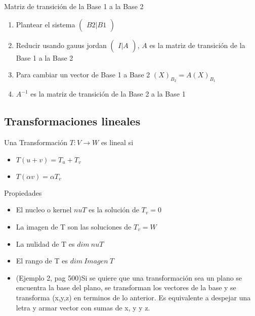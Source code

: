 Matriz de transición de la Base 1 a la Base 2
\begin{enumerate}
	\item Plantear el sistema 
	$\begin{pmatrix}
	B2 | B1
	\end{pmatrix}$
	\item Reducir usando gauus jordan
	$\begin{pmatrix}
	I | A
	\end{pmatrix}$, $A$ es la matriz de transición de la Base 1 a la Base 2
	\item Para cambiar un vector de Base 1 a Base 2 $(X)_{B_2}=A(X)_{B_1}$
	\item $A^{-1}$ es la matriz de transición de la Base 2 a la Base 1
\end{enumerate}

\subsection{Transformaciones lineales}
Una Transformación $T:V\rightarrow W$ es lineal si
\begin{itemize}
	\item $T(u+v)=T_u+T_v$
	\item $T(\alpha v)=\alpha T_v$
\end{itemize}

Propiedades

\begin{itemize}
	\item El nucleo o kernel $nuT$ es la solución de $T_v=0$
	\item La imagen de T son las soluciones de $T_v=W$
	\item La nulidad de T es $dim\  nuT$
	\item El rango de T es $dim\ Imagen\ T$
	\item (Ejemplo 2, pag 500)Si se quiere que una transformación sea un plano se encuentra la base del plano, se transforman los vectores de la base y se transforma (x,y,z) en terminos de lo anterior. Es equivalente a despejar una letra y armar vector con sumas de x, y y z.
\end{itemize}

